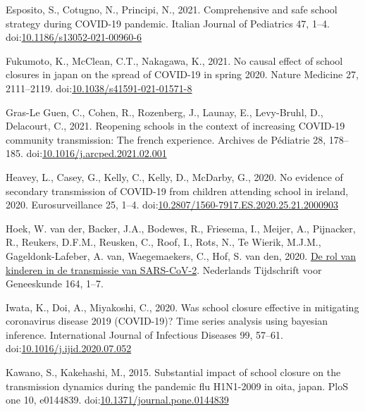 \documentclass[unnumsec,webpdf,contemporary,large]{oup-authoring-template}%
\theoremstyle{thmstyleone}%
\theoremstyle{thmstyletwo}%
\theoremstyle{thmstylethree}%
\newlength{\cslhangindent}
\newlength{\cslentryspacingunit} %
\newenvironment{CSLReferences}[2] %
 {%
  \setlength{\parindent}{0pt}
  \ifodd #1
  \let\oldpar\par
  \def\par{\hangindent=\cslhangindent\oldpar}
  \fi
  \setlength{\parskip}{#2\cslentryspacingunit}
 }%
 {}
\begin{document}
\begin{CSLReferences}{1}{0}
\leavevmode{}%
Esposito, S., Cotugno, N., Principi, N., 2021. Comprehensive and safe school strategy during COVID-19 pandemic. Italian Journal of Pediatrics 47, 1--4. doi:\href{https://doi.org/10.1186/s13052-021-00960-6}{10.1186/s13052-021-00960-6}

\leavevmode{}%
Fukumoto, K., McClean, C.T., Nakagawa, K., 2021. No causal effect of school closures in japan on the spread of COVID-19 in spring 2020. Nature Medicine 27, 2111--2119. doi:\href{https://doi.org/10.1038/s41591-021-01571-8}{10.1038/s41591-021-01571-8}

\leavevmode{}%
Gras-Le Guen, C., Cohen, R., Rozenberg, J., Launay, E., Levy-Bruhl, D., Delacourt, C., 2021. Reopening schools in the context of increasing COVID-19 community transmission: The french experience. Archives de Pédiatrie 28, 178--185. doi:\href{https://doi.org/10.1016/j.arcped.2021.02.001}{10.1016/j.arcped.2021.02.001}

\leavevmode{}%
Heavey, L., Casey, G., Kelly, C., Kelly, D., McDarby, G., 2020. No evidence of secondary transmission of COVID-19 from children attending school in ireland, 2020. Eurosurveillance 25, 1--4. doi:\href{https://doi.org/10.2807/1560-7917.ES.2020.25.21.2000903}{10.2807/1560-7917.ES.2020.25.21.2000903}

\leavevmode{}%
Hoek, W. van der, Backer, J.A., Bodewes, R., Friesema, I., Meijer, A., Pijnacker, R., Reukers, D.F.M., Reusken, C., Roof, I., Rots, N., Te Wierik, M.J.M., Gageldonk-Lafeber, A. van, Waegemaekers, C., Hof, S. van den, 2020. \href{https://www.ntvg.nl/artikelen/de-rol-van-kinderen-de-transmissie-van-sars-cov-2}{De rol van kinderen in de transmissie van SARS-CoV-2}. Nederlands Tijdschrift voor Geneeskunde 164, 1--7.

\leavevmode{}%
Iwata, K., Doi, A., Miyakoshi, C., 2020. Was school closure effective in mitigating coronavirus disease 2019 (COVID-19)? Time series analysis using bayesian inference. International Journal of Infectious Diseases 99, 57--61. doi:\href{https://doi.org/10.1016/j.ijid.2020.07.052}{10.1016/j.ijid.2020.07.052}

\leavevmode{}%
Kawano, S., Kakehashi, M., 2015. Substantial impact of school closure on the transmission dynamics during the pandemic flu H1N1-2009 in oita, japan. PloS one 10, e0144839. doi:\href{https://doi.org/10.1371/journal.pone.0144839}{10.1371/journal.pone.0144839}


\end{CSLReferences}
\end{document}

